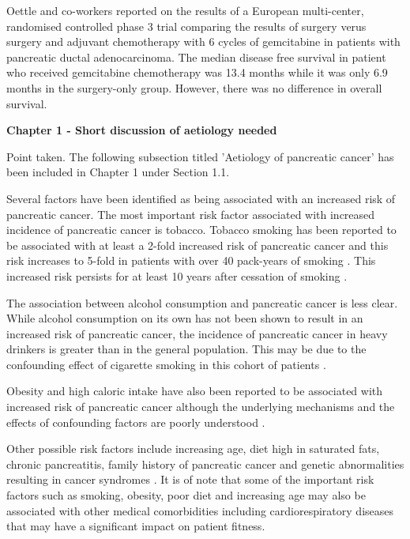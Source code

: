 	Oettle and co-workers reported on the results of a European multi-center, randomised controlled phase 3 trial comparing the results of surgery verus surgery and adjuvant chemotherapy with 6 cycles of gemcitabine in patients with pancreatic ductal adenocarcinoma. 
	The median disease free survival in patient who received gemcitabine chemotherapy was 13.4 months while it was only 6.9 months in the surgery-only group. However, there was no difference in overall survival.
	
	
\textbf{Chapter 1 - Short discussion of aetiology needed}
	
	Point taken. The following subsection titled 'Aetiology of pancreatic cancer' has been included in Chapter 1 under Section 1.1.
	
	Several factors have been identified as being associated with an increased risk of pancreatic cancer.
	The most important risk factor associated with increased incidence of pancreatic cancer is tobacco. 
	Tobacco smoking has been reported to be associated with at least a 2-fold increased risk of pancreatic cancer and this risk increases to 5-fold in patients with over 40 pack-years of smoking \parencite{raimondi_early_2007, iodice_tobacco_2008}. 
	This increased risk persists for at least 10 years after cessation of smoking \parencite{iodice_tobacco_2008}.
	
	The association between alcohol consumption and pancreatic cancer is less clear. 
	While alcohol consumption on its own has not been shown to result in an increased risk of pancreatic cancer, the incidence of pancreatic cancer in heavy drinkers is greater than in the general population.
	This may be due to the confounding effect of cigarette smoking in this cohort of patients \parencite{jiao_alcohol_2009, rohrmann_ethanol_2009}.
	
	Obesity and high caloric intake have also been reported to be associated with increased risk of pancreatic cancer although the underlying mechanisms and the effects of confounding factors are poorly understood \parencite{berrington_de_gonzalez_meta-analysis_2003, larsson_body_2007, li_body_2009}. 
	
	Other possible risk factors include increasing age, diet high in saturated fats, chronic pancreatitis, family history of pancreatic cancer and genetic abnormalities resulting in cancer syndromes \parencite{raimondi_epidemiology_2009, maisonneuve_epidemiology_2010}.
	It is of note that some of the important risk factors such as smoking, obesity, poor diet and increasing age may also be associated with other medical comorbidities including cardiorespiratory diseases that may have a significant impact on patient fitness.
	
